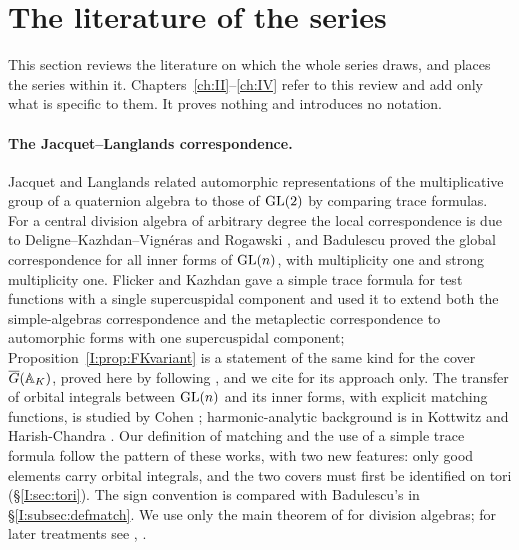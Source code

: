 \section{The literature of the series}\label{I:sec:lit}
This section reviews the literature on which the whole series draws, and places the series within it. Chapters~\ref{ch:II}--\ref{ch:IV} refer to this review and add only what is specific to them. It proves nothing and introduces no notation.

\paragraph{The Jacquet--Langlands correspondence.} Jacquet and Langlands \cite{JL70} related automorphic representations of the multiplicative group of a quaternion algebra to those of $\operatorname{GL}(2)$ by comparing trace formulas. For a central division algebra of arbitrary degree the local correspondence is due to Deligne--Kazhdan--Vign\'eras \cite{DKV84} and Rogawski \cite{Rog83}, and Badulescu \cite{Bad08} proved the global correspondence for all inner forms of $\operatorname{GL}(n)$, with multiplicity one and strong multiplicity one. Flicker and Kazhdan \cite{FK88} gave a simple trace formula for test functions with a single supercuspidal component and used it to extend both the simple-algebras correspondence and the metaplectic correspondence to automorphic forms with one supercuspidal component; Proposition~\ref{I:prop:FKvariant} is a statement of the same kind for the cover $\overline{G}(\mathbb A_K)$, proved here by following \cite[\S18]{FK86}, and we cite \cite{FK88} for its approach only. The transfer of orbital integrals between $\operatorname{GL}(n)$ and its inner forms, with explicit matching functions, is studied by Cohen \cite{Coh18}; harmonic-analytic background is in Kottwitz \cite{Kot05} and Harish-Chandra \cite{HC70}. Our definition of matching and the use of a simple trace formula follow the pattern of these works, with two new features: only good elements carry orbital integrals, and the two covers must first be identified on tori (\S\ref{I:sec:tori}). The sign convention is compared with Badulescu's in \S\ref{I:subsec:defmatch}. We use only the main theorem of \cite{DKV84} for division algebras; for later treatments see \cite{Bad02}, \cite{Bad08}.


